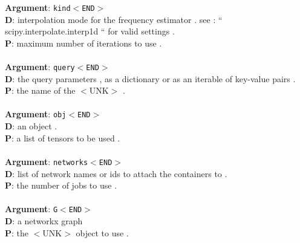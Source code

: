 \textbf{Argument}: \texttt{kind$<$END$>$}\\
\textbf{D}: interpolation mode for the frequency estimator . see : `` scipy.interpolate.interp1d `` for valid settings .\\
\textbf{P}: maximum number of iterations to use .\\
\\

\textbf{Argument}: \texttt{query$<$END$>$}\\
\textbf{D}: the query parameters , as a dictionary or as an iterable of key-value pairs .\\
\textbf{P}: the name of the $<$UNK$>$ .\\
\\

\textbf{Argument}: \texttt{obj$<$END$>$}\\
\textbf{D}: an object .\\
\textbf{P}: a list of tensors to be used .\\
\\

\textbf{Argument}: \texttt{networks$<$END$>$}\\
\textbf{D}: list of network names or ids to attach the containers to .\\
\textbf{P}: the number of jobs to use .\\
\\

\textbf{Argument}: \texttt{G$<$END$>$}\\
\textbf{D}: a networkx graph\\
\textbf{P}: the $<$UNK$>$ object to use .\\
\\

